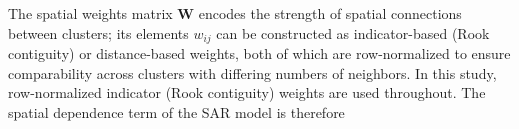 \documentclass{article}[11pt]
\begin{document}





The spatial weights matrix $\mathbf{W}$ encodes the strength of spatial connections between clusters; its elements $w_{ij}$ can be constructed as indicator-based (Rook contiguity) or distance-based weights, both of which are row-normalized to ensure comparability across clusters with differing numbers of neighbors. In this study, row-normalized indicator (Rook contiguity) weights are used throughout. The spatial dependence term of the SAR model is therefore
\end{document}
